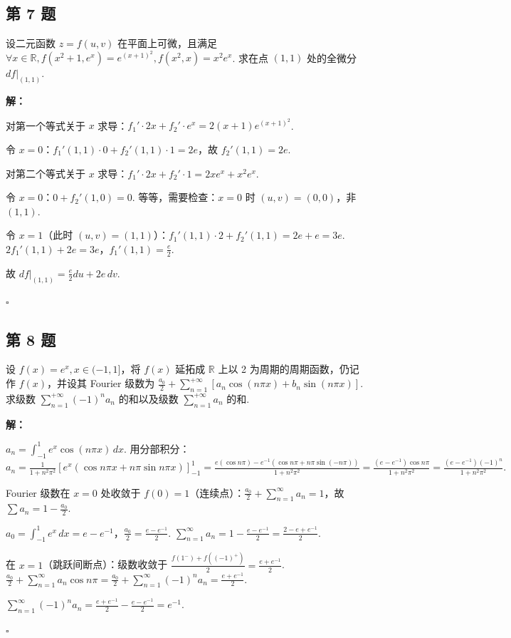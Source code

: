 \documentclass[12pt,a4paper]{article}
\newenvironment{sol}[1][解]{%
  \par\medskip\noindent\textbf{#1：}\itshape\par\noindent\ignorespaces
}{%
  \par\hfill$\square$\par\medskip
}
\begin{document}
\subsection*{第 7 题}
设二元函数 $z=f(u,v)$ 在平面上可微，且满足 $\forall x\in\mathbb{R},
f(x^2+1,e^x)=e^{(x+1)^2}, f(x^2,x)=x^2e^x$. 求在点 $(1,1)$ 处的全微分 $df|_{(1,1)}$.

\begin{sol}对第一个等式关于 $x$ 求导：$f_1'\cdot 2x+f_2'\cdot
  e^x=2(x+1)e^{(x+1)^2}$.

  令 $x=0$：$f_1'(1,1)\cdot 0+f_2'(1,1)\cdot 1=2e$，故 $f_2'(1,1)=2e$.

  对第二个等式关于 $x$ 求导：$f_1'\cdot 2x+f_2'\cdot 1=2xe^x+x^2e^x$.

  令 $x=0$：$0+f_2'(1,0)=0$. 等等，需要检查：$x=0$ 时 $(u,v)=(0,0)$，非 $(1,1)$.

  令 $x=1$（此时 $(u,v)=(1,1)$）：$f_1'(1,1)\cdot 2+f_2'(1,1)=2e+e=3e$.
  $2f_1'(1,1)+2e=3e$，$f_1'(1,1)=\frac{e}{2}$.

  故 $df|_{(1,1)}=\frac{e}{2}du+2e\,dv.$

\end{sol}
\subsection*{第 8 题}
设 $f(x)=e^x, x\in(-1,1]$，将 $f(x)$ 延拓成 $\mathbb{R}$ 上以 2 为周期的周期函数，仍记作
$f(x)$，并设其 Fourier 级数为
$\frac{a_0}{2}+\sum_{n=1}^{+\infty}[a_n\cos(n\pi x)+b_n\sin(n\pi
x)]$. 求级数 $\sum_{n=1}^{+\infty}(-1)^n a_n$ 的和以及级数 $\sum_{n=1}^{+\infty}a_n$ 的和.

\begin{sol}$a_n=\int_{-1}^1 e^x\cos(n\pi x)\,dx$. 用分部积分：
  $a_n=\frac{1}{1+n^2\pi^2}[e^x(\cos n\pi x+n\pi\sin n\pi
  x)]_{-1}^1=\frac{e(\cos n\pi)-e^{-1}(\cos
  n\pi+n\pi\sin(-n\pi))}{1+n^2\pi^2}=\frac{(e-e^{-1})\cos
  n\pi}{1+n^2\pi^2}=\frac{(e-e^{-1})(-1)^n}{1+n^2\pi^2}.$

  Fourier 级数在 $x=0$ 处收敛于
  $f(0)=1$（连续点）：$\frac{a_0}{2}+\sum_{n=1}^{\infty}a_n=1$，故 $\sum
  a_n=1-\frac{a_0}{2}$.

  $a_0=\int_{-1}^1
  e^x\,dx=e-e^{-1}$，$\frac{a_0}{2}=\frac{e-e^{-1}}{2}$.
  $\sum_{n=1}^{\infty}a_n=1-\frac{e-e^{-1}}{2}=\frac{2-e+e^{-1}}{2}$.

  在 $x=1$（跳跃间断点）：级数收敛于 $\frac{f(1^-)+f((-1)^+)}{2}=\frac{e+e^{-1}}{2}$.
  $\frac{a_0}{2}+\sum_{n=1}^{\infty}a_n\cos
  n\pi=\frac{a_0}{2}+\sum_{n=1}^{\infty}(-1)^n a_n=\frac{e+e^{-1}}{2}$.

  $\sum_{n=1}^{\infty}(-1)^n a_n=\frac{e+e^{-1}}{2}-\frac{e-e^{-1}}{2}=e^{-1}.$

\end{sol}
\end{document}

